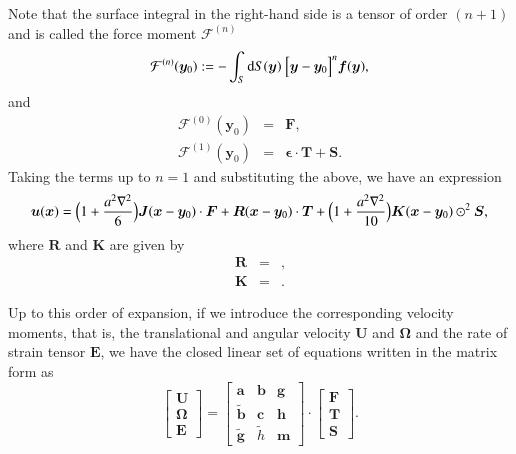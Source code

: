 \documentclass{book}
\begin{document}
Note that the surface integral in the right-hand side
is a tensor of order $(n+1)$ and
is called the force moment $\mathcal{F}^{(n)}$
\begin{equation}
  \mathcal{F}^{(n)}
  (\bm{y}_0)
  :=
  -
  \int_S
  {\rm d}S(\bm{y})\ 
  \Bigl[
    \bm{y}
    -
    \bm{y}_0
  \Bigr]^n
  \bm{f}(\bm{y})
  ,
\end{equation}
and
\begin{eqnarray}
  \mathcal{F}^{(0)}
  (\bm{y}_0)
  &=&
  \bm{F}
  ,\\
  \mathcal{F}^{(1)}
  (\bm{y}_0)
  &=&
  \bm{\epsilon}
  \cdot
  \bm{T}
  +
  \bm{S}
  .
\end{eqnarray}
Taking the terms up to $n=1$ and substituting the above,
we have an expression\cite{durlofsky1987a}
\begin{equation}
  \bm{u}
  (\bm{x})
  =
  \Bigl(
    1
    +
    \frac{a^2\nabla^2}{6}
  \Bigr)
  \bm{J}
  (\bm{x}-\bm{y}_0)
  \cdot
  \bm{F}
  +
  \bm{R}
  (\bm{x}-\bm{y}_0)
  \cdot
  \bm{T}
  +
  \Bigl(
    1
    +
    \frac{a^2\nabla^2}{10}
  \Bigr)
  \bm{K}
  (\bm{x}-\bm{y}_0)
  \odot^2
  \bm{S}
  ,
\end{equation}
where $\bm{R}$ and $\bm{K}$ are given by
\begin{eqnarray}
  \bm{R}
  &=&
  ,\\
  \bm{K}
  &=&
  .
\end{eqnarray}


Up to this order of expansion,
if we introduce the corresponding velocity moments, that is,
the translational and angular velocity $\bm{U}$ and $\bm{\Omega}$
and the rate of strain tensor $\bm{E}$,
we have the closed linear set of equations
written in the matrix form as
\begin{equation}
  \left[
    \begin{array}{c}
      \bm{U}\\
      \bm{\Omega}\\
      \bm{E}
    \end{array}
  \right]
  =
  \left[
    \begin{array}{ccc}
      \bm{a} & \bm{b} & \bm{g}\\
      \tilde{\bm{b}} & \bm{c} & \bm{h}\\
      \tilde{\bm{g}} & \tilde{h} & \bm{m}
    \end{array}
  \right]
  \cdot
  \left[
    \begin{array}{c}
      \bm{F}\\
      \bm{T}\\
      \bm{S}
    \end{array}
  \right]
  .
  \label{eq:mob-fts}
\end{equation}
\end{document}
